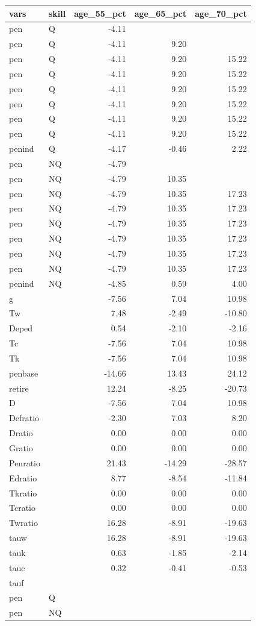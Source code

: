 \begin{tabular}{llrrr}
  \hline
vars & skill & age\_55\_pct & age\_65\_pct & age\_70\_pct \\ 
  \hline
pen & Q & -4.11 &  &  \\ 
  pen & Q & -4.11 & 9.20 &  \\ 
  pen & Q & -4.11 & 9.20 & 15.22 \\ 
  pen & Q & -4.11 & 9.20 & 15.22 \\ 
  pen & Q & -4.11 & 9.20 & 15.22 \\ 
  pen & Q & -4.11 & 9.20 & 15.22 \\ 
  pen & Q & -4.11 & 9.20 & 15.22 \\ 
  pen & Q & -4.11 & 9.20 & 15.22 \\ 
  penind & Q & -4.17 & -0.46 & 2.22 \\ 
  pen & NQ & -4.79 &  &  \\ 
  pen & NQ & -4.79 & 10.35 &  \\ 
  pen & NQ & -4.79 & 10.35 & 17.23 \\ 
  pen & NQ & -4.79 & 10.35 & 17.23 \\ 
  pen & NQ & -4.79 & 10.35 & 17.23 \\ 
  pen & NQ & -4.79 & 10.35 & 17.23 \\ 
  pen & NQ & -4.79 & 10.35 & 17.23 \\ 
  pen & NQ & -4.79 & 10.35 & 17.23 \\ 
  penind & NQ & -4.85 & 0.59 & 4.00 \\ 
  g &  & -7.56 & 7.04 & 10.98 \\ 
  Tw &  & 7.48 & -2.49 & -10.80 \\ 
  Deped &  & 0.54 & -2.10 & -2.16 \\ 
  Tc &  & -7.56 & 7.04 & 10.98 \\ 
  Tk &  & -7.56 & 7.04 & 10.98 \\ 
  penbase &  & -14.66 & 13.43 & 24.12 \\ 
  retire &  & 12.24 & -8.25 & -20.73 \\ 
  D &  & -7.56 & 7.04 & 10.98 \\ 
  Defratio &  & -2.30 & 7.03 & 8.20 \\ 
  Dratio &  & 0.00 & 0.00 & 0.00 \\ 
  Gratio &  & 0.00 & 0.00 & 0.00 \\ 
  Penratio &  & 21.43 & -14.29 & -28.57 \\ 
  Edratio &  & 8.77 & -8.54 & -11.84 \\ 
  Tkratio &  & 0.00 & 0.00 & 0.00 \\ 
  Tcratio &  & 0.00 & 0.00 & 0.00 \\ 
  Twratio &  & 16.28 & -8.91 & -19.63 \\ 
  tauw &  & 16.28 & -8.91 & -19.63 \\ 
  tauk &  & 0.63 & -1.85 & -2.14 \\ 
  tauc &  & 0.32 & -0.41 & -0.53 \\ 
  tauf &  &  &  &  \\ 
  pen & Q &  &  &  \\ 
  pen & NQ &  &  &  \\ 
   \hline
\end{tabular}
